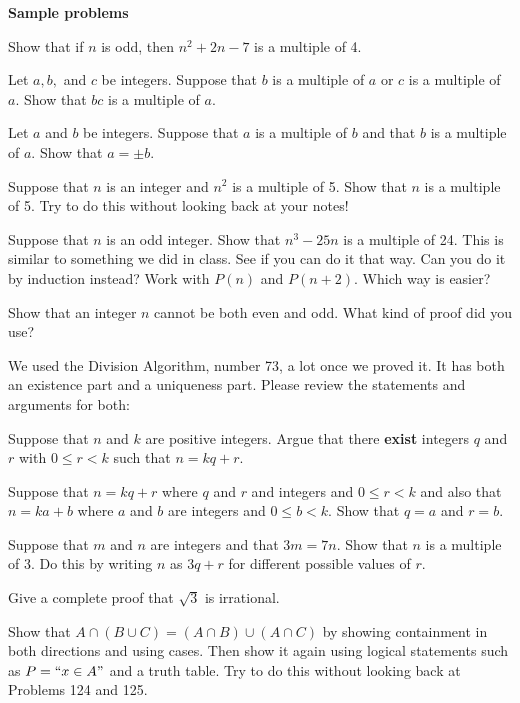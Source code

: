 \pagebreak

\noindent
{\bf Sample problems}
\blist{0.2in}
\item Show that if $n$ is odd, then $n^2 + 2n - 7$ is a multiple of 4.
\item Let $a, b,$ and $c$ be integers.
Suppose that $b$ is a multiple of $a$ or $c$ is a multiple of $a$.
Show that $bc$ is a multiple of $a$.
\item Let $a$ and $b$ be integers.
Suppose that $a$ is a multiple of $b$ and that $b$ is a multiple of $a$.
Show that $a = \pm b$.

\item Suppose that $n$ is an integer and $n^2$ is a multiple of 5.
Show that $n$ is a multiple of 5.
Try to do this without looking back at your notes!

\item Suppose that $n$ is an odd integer.
Show that $n^3 - 25n$ is a multiple of 24.
This is similar to something we did in class.
See if you can do it that way.
Can you do it by induction instead?
Work with $P(n)$ and $P(n+2)$.
Which way is easier?

\item Show that an integer $n$ cannot be both even and odd.
What kind of proof did you use?

\item We used the Division Algorithm, number 73, a lot once we proved it.
It has both an existence part and a uniqueness part.
Please review the statements and arguments for both:

Suppose that $n$ and $k$ are positive integers.
Argue that there {\bf exist} integers $q$ and $r$ with $0 \leq r < k$ such that $n = kq + r$.

Suppose that $n = kq + r$ where $q$ and $r$ and integers and $0 \leq r < k$ and also that $n = ka + b$ where $a$ and $b$ are integers and $0 \leq b < k$.
Show that $q=a$ and $r=b$.

\item Suppose that $m$ and $n$ are integers and that $3m = 7n$.
Show that $n$ is a multiple of 3.
Do this by writing $n$ as $3q+r$ for different possible values of $r$.

\item Give a complete proof that $\sqrt{3}$ is irrational.

\item Show that $A \cap (B \cup C) = (A \cap B) \cup (A \cap C)$ by showing containment in both directions and using cases.
Then show it again using logical statements such as $P = ``x \in A"$ and a truth table.
Try to do this without looking back at Problems 124 and 125.

